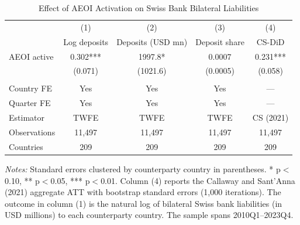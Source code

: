 \begin{table}[H]
\centering
\caption{Effect of AEOI Activation on Swiss Bank Bilateral Liabilities}
\label{tab:main}
\begin{threeparttable}
\begin{tabular}{lcccc}
\toprule
& (1) & (2) & (3) & (4) \\
& Log deposits & Deposits (USD mn) & Deposit share & CS-DiD \\
\midrule
AEOI active & 0.302*** & 1997.8* & 0.0007 & 0.231*** \\
& (0.071) & (1021.6) & (0.0005) & (0.058) \\
\\
Country FE & Yes & Yes & Yes & --- \\
Quarter FE & Yes & Yes & Yes & --- \\
Estimator & TWFE & TWFE & TWFE & CS (2021) \\
Observations & 11,497 & 11,497 & 11,497 & 11,497 \\
Countries & 209 & 209 & 209 & 209 \\
\bottomrule
\end{tabular}
\begin{tablenotes}[flushleft]
\small
\item \textit{Notes:} Standard errors clustered by counterparty country in parentheses. * p$<$0.10, ** p$<$0.05, *** p$<$0.01. Column (4) reports the Callaway and Sant'Anna (2021) aggregate ATT with bootstrap standard errors (1,000 iterations). The outcome in column (1) is the natural log of bilateral Swiss bank liabilities (in USD millions) to each counterparty country. The sample spans 2010Q1--2023Q4.
\end{tablenotes}
\end{threeparttable}
\end{table}

